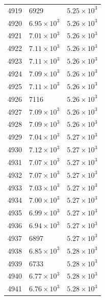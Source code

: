 \begin{table}[H]
\begin{tabular}{lll}
4919 & 6929 & $\displaystyle 5.25 \times 10^{3}$ \\
4920 & $\displaystyle 6.95 \times 10^{3}$ & $\displaystyle 5.26 \times 10^{3}$ \\
4921 & $\displaystyle 7.01 \times 10^{3}$ & $\displaystyle 5.26 \times 10^{3}$ \\
4922 & $\displaystyle 7.11 \times 10^{3}$ & $\displaystyle 5.26 \times 10^{3}$ \\
4923 & $\displaystyle 7.11 \times 10^{3}$ & $\displaystyle 5.26 \times 10^{3}$ \\
4924 & $\displaystyle 7.09 \times 10^{3}$ & $\displaystyle 5.26 \times 10^{3}$ \\
4925 & $\displaystyle 7.11 \times 10^{3}$ & $\displaystyle 5.26 \times 10^{3}$ \\
4926 & 7116 & $\displaystyle 5.26 \times 10^{3}$ \\
4927 & $\displaystyle 7.09 \times 10^{3}$ & $\displaystyle 5.26 \times 10^{3}$ \\
4928 & $\displaystyle 7.09 \times 10^{3}$ & $\displaystyle 5.26 \times 10^{3}$ \\
4929 & $\displaystyle 7.04 \times 10^{3}$ & $\displaystyle 5.27 \times 10^{3}$ \\
4930 & $\displaystyle 7.12 \times 10^{3}$ & $\displaystyle 5.27 \times 10^{3}$ \\
4931 & $\displaystyle 7.07 \times 10^{3}$ & $\displaystyle 5.27 \times 10^{3}$ \\
4932 & $\displaystyle 7.07 \times 10^{3}$ & $\displaystyle 5.27 \times 10^{3}$ \\
4933 & $\displaystyle 7.03 \times 10^{3}$ & $\displaystyle 5.27 \times 10^{3}$ \\
4934 & $\displaystyle 7.00 \times 10^{3}$ & $\displaystyle 5.27 \times 10^{3}$ \\
4935 & $\displaystyle 6.99 \times 10^{3}$ & $\displaystyle 5.27 \times 10^{3}$ \\
4936 & $\displaystyle 6.94 \times 10^{3}$ & $\displaystyle 5.27 \times 10^{3}$ \\
4937 & 6897 & $\displaystyle 5.27 \times 10^{3}$ \\
4938 & $\displaystyle 6.85 \times 10^{3}$ & $\displaystyle 5.28 \times 10^{3}$ \\
4939 & 6733 & $\displaystyle 5.28 \times 10^{3}$ \\
4940 & $\displaystyle 6.77 \times 10^{3}$ & $\displaystyle 5.28 \times 10^{3}$ \\
4941 & $\displaystyle 6.76 \times 10^{3}$ & $\displaystyle 5.28 \times 10^{3}$ \\

\end{tabular}
\end{table}
